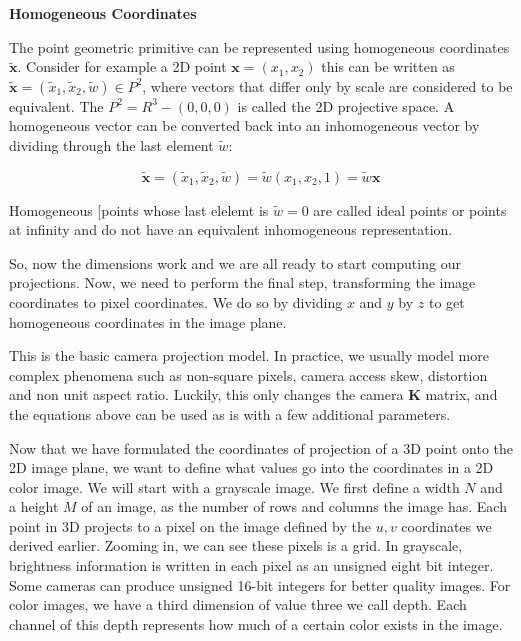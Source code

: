 \begin{framed}
\begin{remark}{\textbf{Homogeneous Coordinates}}

The point geometric primitive can be represented using homogeneous coordinates $\tilde{\mathbf{x}}$. Consider for example a 2D point
$\mathbf{x} = (x_1, x_2)$ this can be written as $\tilde{\mathbf{x}} = (\tilde{x}_1, \tilde{x}_2, \tilde{w}) \in P^2 $, where vectors
that differ only by scale are considered to be equivalent. The $P^2 = R^3 - (0,0,0)$ is called the 2D projective space. A homogeneous
vector can be converted back into an inhomogeneous vector by dividing through the last element $\tilde{w}$:

\begin{equation}
\tilde{\mathbf{x}} = (\tilde{x}_1, \tilde{x}_2, \tilde{w}) = \tilde{w}(x_1, x_2, 1) = \tilde{w}\mathbf{x}
\end{equation}

Homogeneous [points whose last elelemt is $\tilde{w}=0$ are called ideal points or points at infinity and do not have an equivalent
inhomogeneous representation.
\end{remark}
\end{framed}


So, now the dimensions work and we are all ready to start computing
our projections. Now, we need to perform
the final step, transforming the image coordinates to pixel coordinates. 
We do so by dividing $x$ and $y$ by $z$ to get homogeneous coordinates in the image plane. 

This is the basic  camera projection model. In practice, we usually model more complex phenomena
such as non-square pixels, camera access skew, distortion and non unit aspect ratio. Luckily, this only changes
the camera $\mathbf{K}$ matrix, and the equations above can be used as is with a few additional parameters. 

Now that we have formulated
the coordinates of projection of a 3D point onto
the 2D image plane, we want to define
what values go into the coordinates in
a 2D color image. We will start with
a grayscale image. We first define a width $N$
and a height $M$ of an image, as the number of rows and
columns the image has. Each point in 3D projects
to a pixel on the image defined by the $u, v$ coordinates
we derived earlier. Zooming in, we can see
these pixels is a grid. In grayscale, brightness
information is written in each pixel as
an unsigned eight bit integer. Some cameras can produce unsigned 16-bit integers
for better quality images. For color images, we have a third dimension of value
three we call depth. Each channel of
this depth represents how much of a certain color
exists in the image. 

